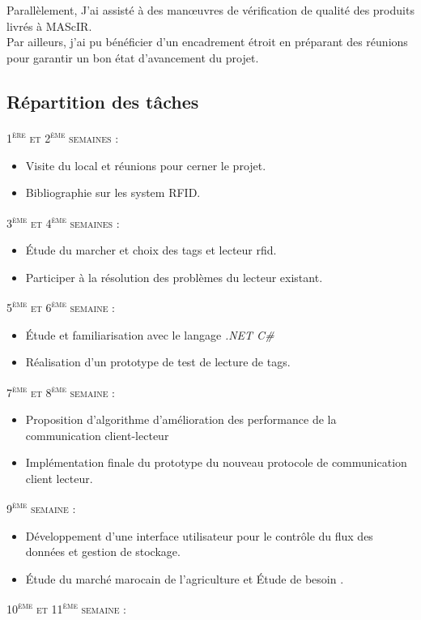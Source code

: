 \documentclass[11pt, a4paper, twoside]{book}
\begin{document}
Parallèlement, J’ai assisté à des manœuvres de vérification de qualité des produits livrés à MAScIR.\\

Par ailleurs, j’ai pu bénéficier d’un encadrement étroit en préparant des réunions pour garantir un bon état d’avancement du projet.

\subsection{Répartition des tâches}
\noindent
\textsc{1\textsuperscript{ère} et 2\textsuperscript{ème} semaines :}
\begin{itemize}
\item Visite du local et réunions pour cerner le projet.
\item Bibliographie sur les system RFID.
\end{itemize}
\textsc{3\textsuperscript{ème} et 4\textsuperscript{ème} semaines :}
\begin{itemize}
\item Étude du marcher et choix des tags et lecteur rfid.
\item Participer à la résolution des problèmes du lecteur existant.
\end{itemize}
\textsc{5\textsuperscript{ème} et 6\textsuperscript{ème} semaine :}
\begin{itemize}
\item Étude et familiarisation avec le langage \emph{.NET  C\#}
\item Réalisation d'un prototype de test de lecture de tags.
\end{itemize}
\textsc{7\textsuperscript{ème} et 8\textsuperscript{ème} semaine :}
\begin{itemize}
\item Proposition d'algorithme d'amélioration des performance de la communication client-lecteur
\item Implémentation finale du prototype du nouveau protocole de communication client lecteur.
\end{itemize}
\textsc{9\textsuperscript{ème} semaine :}
\begin{itemize}
\item Développement d'une interface utilisateur pour le contrôle du flux des données et gestion de stockage.
\item Étude du marché marocain de l'agriculture et Étude de besoin .
\end{itemize}
\textsc{10\textsuperscript{ème} et 11\textsuperscript{ème} semaine :}
\end{document}
